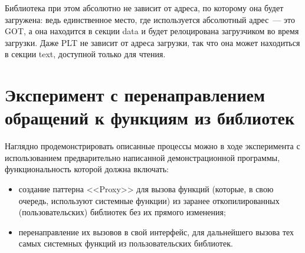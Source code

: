 \documentclass[10pt, a5paper]{article}
\begin{document}
Библиотека при этом абсолютно не зависит от адреса, по которому она будет загружена: ведь единственное место, где используется абсолютный адрес~--- это GOT, а она находится в секции data и будет релоцирована загрузчиком во время загрузки. Даже PLT не зависит от адреса загрузки, так что она может находиться в секции text, доступной только для чтения.

\section*{Эксперимент с перенаправлением обращений к функциям из библиотек}

Наглядно продемонстрировать описанные процессы можно в ходе эксперимента с использованием предварительно написанной демонстрационной программы, функциональность которой должна включать:

\begin{itemize}
  \item создание паттерна <<Proxy>> для вызова функций (которые, в свою очередь, используют системные функции) из заранее откопилированных (пользовательских) библиотек без их прямого изменения;
  \item перенаправление их вызовов в свой интерфейс, для дальнейшего вызова тех самых системных функций из пользовательских библиотек.
\end{itemize}
\end{document}
